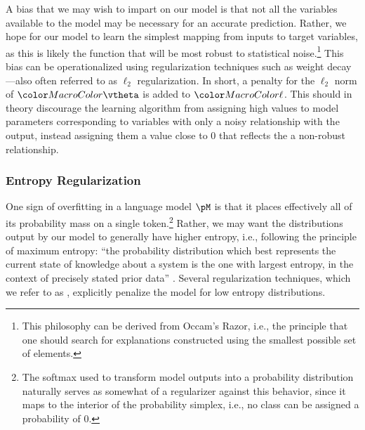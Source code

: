 A bias that we may wish to impart on our model is that not all the variables available to the model may be necessary for an accurate prediction. Rather, we hope for our model to learn the simplest mapping from inputs to target variables, as this is likely the function that will be most robust to statistical noise.\footnote{This philosophy can be derived from Occam's Razor, i.e., the principle that one should search for explanations constructed using the smallest possible set of elements.} This bias can be operationalized using regularization techniques such as weight decay \citep{Goodfellow-et-al-2016}---also often referred to as $\ell_2$ regularization. In short, a penalty for the $\ell_2$ norm of $\modelparams$ is added to $\loss$. This should in theory discourage the learning algorithm from assigning high values to model parameters corresponding to variables with  only a noisy relationship with the output, instead assigning them a value close to 0 that reflects the a non-robust relationship. 


\subsubsection{Entropy Regularization} 
One sign of overfitting in  a language model $\pM$ is that it places effectively all of its probability mass on a single token.\footnote{The softmax used to transform model outputs into a probability distribution naturally serves as somewhat of a regularizer against this behavior, since it maps to the interior of the probability simplex, i.e., no class can be assigned a probability of $0$. } Rather, we may want the distributions output by our model to generally have higher entropy, i.e., following the principle of maximum entropy: ``the probability distribution which best represents the current state of knowledge about a system is the one with largest entropy, in the context of precisely stated prior data'' \cite{jaynes}. Several regularization techniques, which we refer to as , explicitly penalize the model for low entropy distributions. 

